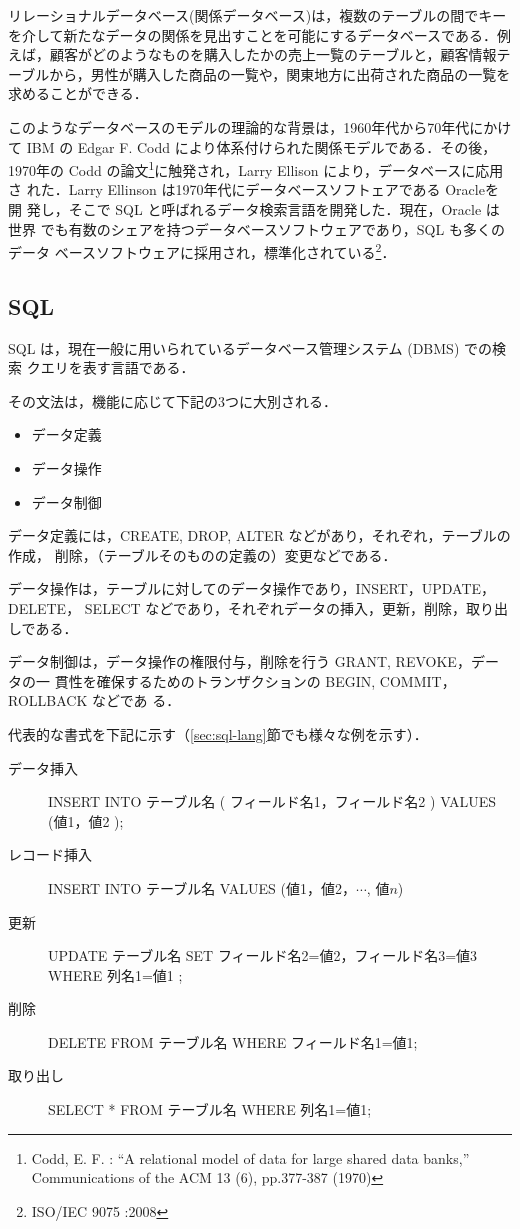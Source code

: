 リレーショナルデータベース(関係データベース)は，複数のテーブルの間でキー
を介して新たなデータの関係を見出すことを可能にするデータベースである．例
えば，顧客がどのようなものを購入したかの売上一覧のテーブルと，顧客情報テ
ーブルから，男性が購入した商品の一覧や，関東地方に出荷された商品の一覧を
求めることができる．

このようなデータベースのモデルの理論的な背景は，1960年代から70年代にかけ
て IBM の Edgar F. Codd により体系付けられた関係モデルである．その後，
1970年の Codd の論文\footnote{Codd, E. F. : ``A relational model of data 
for large shared data banks,'' Communications of the ACM 13 (6), 
pp.377-387 (1970)}に触発され，Larry Ellison により，データベースに応用さ
れた．Larry Ellinson は1970年代にデータベースソフトェアである Oracleを開
発し，そこで SQL と呼ばれるデータ検索言語を開発した．現在，Oracle は世界
でも有数のシェアを持つデータベースソフトウェアであり，SQL も多くのデータ
ベースソフトウェアに採用され，標準化されている\footnote{ISO/IEC 9075 
:2008}．

\subsection{SQL}

SQL は，現在一般に用いられているデータベース管理システム (DBMS) での検索
クエリを表す言語である．

その文法は，機能に応じて下記の3つに大別される．
\begin{itemize}
 \item データ定義
 \item データ操作
 \item データ制御
\end{itemize}

データ定義には，CREATE, DROP, ALTER などがあり，それぞれ，テーブルの作成，
削除，（テーブルそのものの定義の）変更などである．

データ操作は，テーブルに対してのデータ操作であり，INSERT，UPDATE，DELETE，
SELECT などであり，それぞれデータの挿入，更新，削除，取り出しである．

データ制御は，データ操作の権限付与，削除を行う GRANT, REVOKE，データの一
貫性を確保するためのトランザクションの BEGIN, COMMIT，ROLLBACK などであ
る．

代表的な書式を下記に示す（\ref{sec:sql-lang}節でも様々な例を示す）．

\begin{description}
  \item[データ挿入] 
       INSERT INTO テーブル名 ( フィールド名1，フィールド名2 ) VALUES  (値1，値2 );
 \item[レコード挿入]
       INSERT INTO テーブル名 VALUES (値1，値2，$\cdots$, 値$n$)
 \item[更新]
       UPDATE テーブル名 SET フィールド名2=値2，フィールド名3=値3 WHERE
       列名1=値1 ;
 \item[削除] 
       DELETE FROM テーブル名 WHERE フィールド名1=値1;
 \item[取り出し]  
       SELECT * FROM テーブル名 WHERE 列名1=値1;
\end{description}

